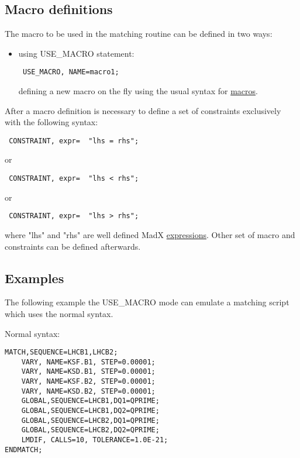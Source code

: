 \subsection{Macro definitions}
The macro to be used in the matching routine can be defined in two ways:
 
\begin{itemize}
	\item using USE\_MACRO statement:

\begin{verbatim}
 USE_MACRO, NAME=macro1;
\end{verbatim}

defining a new macro on the fly using the usual syntax for \href{../control/special.html#macro}{ macros}. 
\end{itemize}
 
After a macro definition is necessary to define a set of constraints exclusively with the following syntax:
 
\begin{verbatim}
 CONSTRAINT, expr=  "lhs = rhs"; 
\end{verbatim}

or 
\begin{verbatim}
 CONSTRAINT, expr=  "lhs < rhs"; 
\end{verbatim}

or
\begin{verbatim}
 CONSTRAINT, expr=  "lhs > rhs"; 
\end{verbatim}

where "lhs" and "rhs" are well defined MadX \href{../Introduction/expression.html}{expressions}. Other set of macro and constraints can be defined afterwards.

\subsection{Examples}
The following example the USE\_MACRO mode can emulate a matching script which uses the normal syntax.

Normal syntax:

\begin{verbatim}
MATCH,SEQUENCE=LHCB1,LHCB2;
    VARY, NAME=KSF.B1, STEP=0.00001;
    VARY, NAME=KSD.B1, STEP=0.00001;
    VARY, NAME=KSF.B2, STEP=0.00001;
    VARY, NAME=KSD.B2, STEP=0.00001;
    GLOBAL,SEQUENCE=LHCB1,DQ1=QPRIME;
    GLOBAL,SEQUENCE=LHCB1,DQ2=QPRIME;
    GLOBAL,SEQUENCE=LHCB2,DQ1=QPRIME;
    GLOBAL,SEQUENCE=LHCB2,DQ2=QPRIME;
    LMDIF, CALLS=10, TOLERANCE=1.0E-21;
ENDMATCH;
\end{verbatim}

